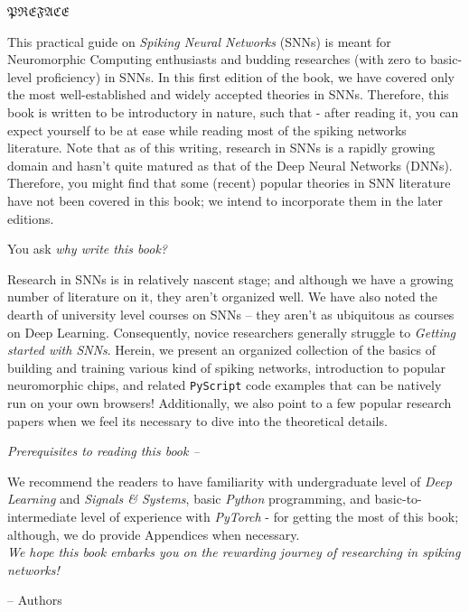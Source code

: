\begin{center}
    \Large$\mathfrak{PREFACE}$
\end{center}

This practical guide on \textit{Spiking Neural Networks} (SNNs) is meant for Neuromorphic Computing enthusiasts and budding researches (with zero to basic-level proficiency)
in SNNs. In this first edition of the book, we have covered only the most well-established and widely accepted theories in SNNs. Therefore, this book is written to be introductory in nature, such that - after reading it, you can expect yourself to be at ease while reading most of the spiking networks literature. Note that as of this writing, research in SNNs is a rapidly growing domain and hasn't quite matured as that of the Deep Neural Networks (DNNs). Therefore, you might find that some (recent) popular theories in SNN literature have not been covered in this book; we intend to incorporate them in the later editions.

You ask \textit{why write this book?}

Research in SNNs is in relatively nascent stage; and although we have a growing number of literature on it, they aren't organized well. We have also noted the dearth of university level courses on SNNs -- they aren't as ubiquitous as courses on Deep Learning. Consequently, novice researchers generally struggle to \textit{Getting started with SNNs}. Herein, we present an organized collection of the basics of building and training various kind of spiking networks, introduction to popular neuromorphic chips, and related \texttt{PyScript} code examples that can be natively run on your own browsers! Additionally, we also point to a few popular research papers when we feel its necessary to dive into the theoretical details.

\textit{Prerequisites to reading this book --}

We recommend the readers to have familiarity with undergraduate level of \textit{Deep Learning} and \textit{Signals \& Systems}, basic \textit{Python} programming, and basic-to-intermediate level of experience with \textit{PyTorch} - for getting the most of this book; although, we do provide Appendices when necessary.
\\
\linebreak
\linebreak
\linebreak
\textit{We hope this book embarks you on the rewarding journey of researching in spiking networks!}

-- Authors